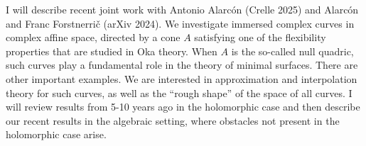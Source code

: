 {%
    I will describe recent joint work with Antonio Alarcón
    (Crelle 2025) and Alarcón and Franc Forstnerrič (arXiv 2024).
    We investigate immersed complex curves in complex affine space,
    directed by a cone $A$ satisfying one of the flexibility
    properties that are studied in Oka theory. When $A$ is the
    so-called null quadric, such curves play a fundamental role in
    the theory of minimal surfaces. There are other important
    examples.  We are interested in approximation and interpolation
    theory for such curves, as well as the ``rough shape'' of the
    space of all curves. I will review results from 5-10 years ago
    in the holomorphic case and then describe our recent results in
    the algebraic setting, where obstacles not present in the
    holomorphic case arise.
}
